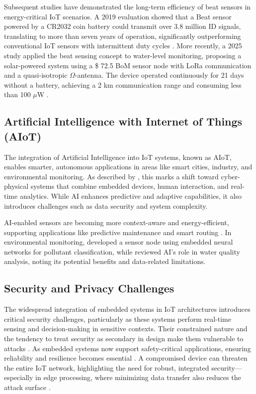 \documentclass[conference]{IEEEtran}
\begin{document}
Subsequent studies have demonstrated the long-term efficiency of beat sensors in energy-critical IoT scenarios. A 2019 evaluation showed that a Beat sensor powered by a CR2032 coin battery could transmit over 3.8 million ID signals, translating to more than seven years of operation, significantly outperforming conventional IoT sensors with intermittent duty cycles \cite{ishibashi_2019_long}. More recently, a 2025 study applied the beat sensing concept to water-level monitoring, proposing a solar-powered system using a \$ 72.5 BoM sensor node with LoRa communication and a quasi-isotropic $\Omega$-antenna. The device operated continuously for 21 days without a battery, achieving a 2 km communication range and consuming less than 100 $\mu$W \cite{dao_2025_lowcost}.

\subsection{Artificial Intelligence with Internet of Things (AIoT)}

The integration of Artificial Intelligence into IoT systems, known as AIoT, enables smarter, autonomous applications in areas like smart cities, industry, and environmental monitoring. As described by \cite{ghosh_2018_artificial}, this marks a shift toward cyber-physical systems that combine embedded devices, human interaction, and real-time analytics. While AI enhances predictive and adaptive capabilities, it also introduces challenges such as data security and system complexity.

AI-enabled sensors are becoming more context-aware and energy-efficient, supporting applications like predictive maintenance and smart routing \cite{mukhopadhyay_2021_artificial}. In environmental monitoring, \cite{ferreira_2023_conception} developed a sensor node using embedded neural networks for pollutant classification, while \cite{nr_2025_ai} reviewed AI's role in water quality analysis, noting its potential benefits and data-related limitations.

\subsection{Security and Privacy Challenges}

The widespread integration of embedded systems in IoT architectures introduces critical security challenges, particularly as these systems perform real-time sensing and decision-making in sensitive contexts. Their constrained nature and the tendency to treat security as secondary in design make them vulnerable to attacks \cite{pimentel_2017_exploring}. As embedded systems now support safety-critical applications, ensuring reliability and resilience becomes essential \cite{koulamas_2018_realtime}. A compromised device can threaten the entire IoT network, highlighting the need for robust, integrated security—especially in edge processing, where minimizing data transfer also reduces the attack surface \cite{tien_2017_internet}.
\end{document}
